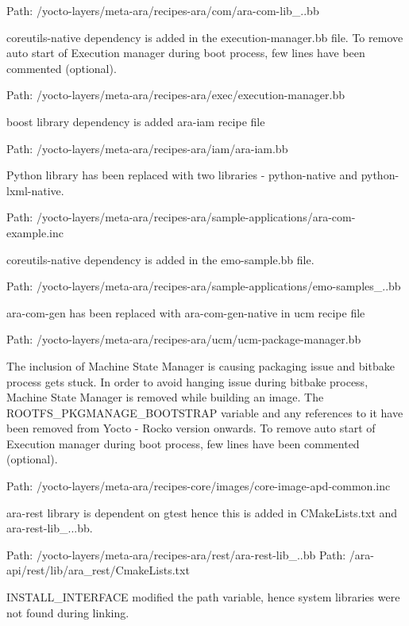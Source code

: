 \begin{DoxyEnumerate}
Path\+: /yocto-\/layers/meta-\/ara/recipes-\/ara/com/ara-\/com-\/lib\+\_..\+bb 
\item coreutils-\/native dependency is added in the execution-\/manager.\+bb file. To remove auto start of Execution manager during boot process, few lines have been commented (optional).

Path\+: /yocto-\/layers/meta-\/ara/recipes-\/ara/exec/execution-\/manager.bb 
\item boost library dependency is added ara-\/iam recipe file

Path\+: /yocto-\/layers/meta-\/ara/recipes-\/ara/iam/ara-\/iam.bb 
\item Python library has been replaced with two libraries -\/ python-\/native and python-\/lxml-\/native.

Path\+: /yocto-\/layers/meta-\/ara/recipes-\/ara/sample-\/applications/ara-\/com-\/example.inc 
\item coreutils-\/native dependency is added in the emo-\/sample.\+bb file.

Path\+: /yocto-\/layers/meta-\/ara/recipes-\/ara/sample-\/applications/emo-\/samples\+\_..\+bb 
\item ara-\/com-\/gen has been replaced with ara-\/com-\/gen-\/native in ucm recipe file

Path\+: /yocto-\/layers/meta-\/ara/recipes-\/ara/ucm/ucm-\/package-\/manager.bb 
\item The inclusion of Machine State Manager is causing packaging issue and bitbake process gets stuck. In order to avoid hanging issue during bitbake process, Machine State Manager is removed while building an image. The R\+O\+O\+T\+F\+S\+\_\+\+P\+K\+G\+M\+A\+N\+A\+G\+E\+\_\+\+B\+O\+O\+T\+S\+T\+R\+AP variable and any references to it have been removed from Yocto -\/ Rocko version onwards. To remove auto start of Execution manager during boot process, few lines have been commented (optional).

Path\+: /yocto-\/layers/meta-\/ara/recipes-\/core/images/core-\/image-\/apd-\/common.inc 
\item ara-\/rest library is dependent on gtest hence this is added in C\+Make\+Lists.\+txt and ara-\/rest-\/lib\+\_...\+bb.

Path\+: /yocto-\/layers/meta-\/ara/recipes-\/ara/rest/ara-\/rest-\/lib\+\_..\+bb  Path\+: /ara-\/api/rest/lib/ara\+\_\+rest/\+Cmake\+Lists.txt 
\item I\+N\+S\+T\+A\+L\+L\+\_\+\+I\+N\+T\+E\+R\+F\+A\+CE modified the path variable, hence system libraries were not found during linking.


\end{DoxyEnumerate}

